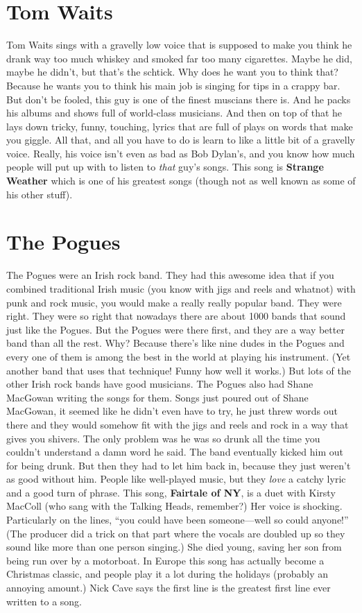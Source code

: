 \documentclass[letterpaper,single]{article}
\begin{document}
\section{Tom Waits}
Tom Waits sings with a gravelly low voice that is supposed to make you think he drank way too much whiskey and smoked far too many cigarettes. 
Maybe he did, maybe he didn't, but that's the schtick. 
Why does he want you to think that? 
Because he wants you to think his main job is singing for tips in a crappy bar. 
But don't be fooled, this guy is one of the finest muscians there is. 
And he packs his albums and shows full of world-class musicians. 
And then on top of that he lays down tricky, funny, touching, lyrics that are full of plays on words that make you giggle.
All that, and all you have to do is learn to like a little bit of a gravelly voice. 
Really, his voice isn't even as bad as Bob Dylan's, and you know how much people will put up with to listen to \emph{that} guy's songs.
This song is \textbf{Strange Weather} which is one of his greatest songs (though not as well known as some of his other stuff).

\section{The Pogues}
The Pogues were an Irish rock band. 
They had this awesome idea that if you combined traditional Irish music (you know with jigs and reels and whatnot) with punk and rock music, you would make a really really popular band. 
They were right. 
They were so right that nowadays there are about 1000 bands that sound just like the Pogues. 
But the Pogues were there first, and they are a way better band than all the rest. 
Why? 
Because there's like nine dudes in the Pogues and every one of them is among the best in the world at playing his instrument. (Yet another band that uses that technique! Funny how well it works.) 
But lots of the other Irish rock bands have good musicians. 
The Pogues also had Shane MacGowan writing the songs for them. 
Songs just poured out of Shane MacGowan, it seemed like he didn't even have to try, he just threw words out there and they would somehow fit with the jigs and reels and rock in a way that gives you shivers. 
The only problem was he was so drunk all the time you couldn't understand a damn word he said. 
The band eventually kicked him out for being drunk. 
But then they had to let him back in, because they just weren't as good without him. 
People like well-played music, but they \emph{love} a catchy lyric and a good turn of phrase. 
This song, \textbf{Fairtale of NY}, is a duet with Kirsty MacColl (who sang with the Talking Heads, remember?) 
Her voice is shocking. 
Particularly on the lines, ``you could have been someone---well so could anyone!''
(The producer did a trick on that part where the vocals are doubled up so they sound like more than one person singing.) 
She died young, saving her son from being run over by a motorboat. 
In Europe this song has actually become a Christmas classic, and people play it a lot during the holidays (probably an annoying amount.) 
Nick Cave says the first line is the greatest first line ever written to a song.
\end{document}
